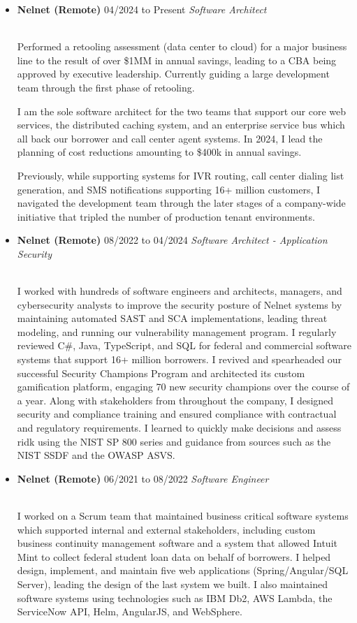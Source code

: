 \documentclass[11pt]{article}
\newcommand{\job}[3]{\vspace{1.5mm}
  \textbf{#1} \hfill #2 \linebreak \textit{#3}
}
\begin{document}
\begin{itemize}[leftmargin=*]
	\item[]
	      \job
	      {Nelnet (Remote)}
	      {04/2024 to Present}
	      {Software Architect}
               {\\Performed a retooling assessment (data center to cloud) for a major business line to the result of over \$1MM in annual savings, leading to a CBA being approved by executive leadership. Currently guiding a large development team through the first phase of retooling.\par
I am the sole software architect for the two teams that support our core web services, the distributed caching system, and an enterprise service bus which all back our borrower and call center agent systems. In 2024, I lead the planning of cost reductions amounting to \$400k in annual savings.\par
Previously, while supporting systems for IVR routing, call center dialing list generation, and SMS notifications supporting 16+ million customers, I navigated the development team through the later stages of a company-wide initiative that tripled the number of production tenant environments.}
	\item[]
	      \job
	      {Nelnet (Remote)}
	      {08/2022 to 04/2024}
	      {Software Architect - Application Security}
               {\\I worked with hundreds of software engineers and architects, managers, and cybersecurity analysts to improve the security posture of Nelnet systems by maintaining automated SAST and SCA implementations, leading threat modeling, and running our vulnerability management program. I regularly reviewed C\#, Java, TypeScript, and SQL for federal and commercial software systems that support 16+ million borrowers. I revived and spearheaded our successful Security Champions Program and architected its custom gamification platform, engaging 70 new security champions over the course of a year. Along with stakeholders from throughout the company, I designed security and compliance training and ensured compliance with contractual and regulatory requirements. I learned to quickly make decisions and assess ridk using the NIST SP 800 series and guidance from sources such as the NIST SSDF and the OWASP ASVS.}
	\item[]
	      \job
	      {Nelnet (Remote)}
	      {06/2021 to 08/2022}
	      {Software Engineer}
	      {\\I worked on a Scrum team that maintained business critical software systems which supported internal and external stakeholders, including custom business continuity management software and a system that allowed Intuit Mint to collect federal student loan data on behalf of borrowers. I helped design, implement, and maintain five web applications (Spring/Angular/SQL Server), leading the design of the last system we built. I also maintained software systems using technologies such as IBM Db2, AWS Lambda, the ServiceNow API, Helm, AngularJS, and WebSphere.\par
}
\end{itemize}
\end{document}

